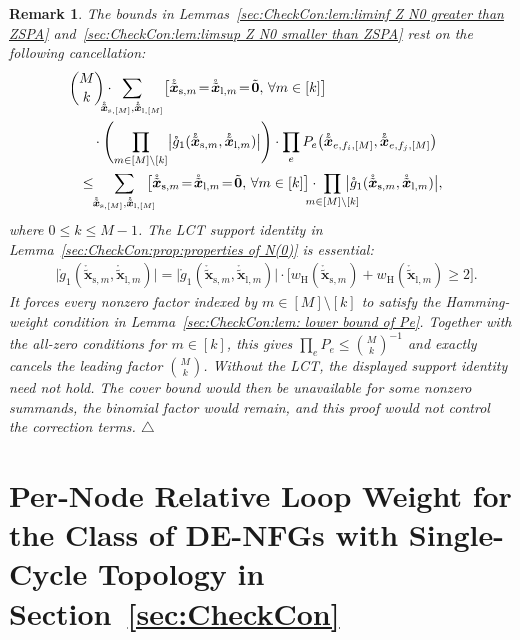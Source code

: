 \documentclass[journal]{IEEEtran}
\newcommand{\add}[1]{{\color{black}#1}}
\newtheorem{remark}[theorem]{Remark}
\newcommand{\manualendsymbol}[1]{%
  \leavevmode\unskip\penalty9999\hbox{}\nobreak\hfill
  \quad\hbox{#1}}
\newcommand{\eremark}{\manualendsymbol{\ensuremath{\triangle}}}
\newcommand{\vect}[1]{ \bm{#1} }
\newcommand{\wh}{w_{\mathrm{H}}}
\newcommand{\LCTtv}[1]{ \mathring{ \tilde{ \vect{#1} } } }
\newcommand{\LCT}[1]{ \mathring{#1} }
\newcommand{\efi}{ e,f_i }
\newcommand{\efj}{ e,f_j }
\newcommand{\LCTvxlm}{ \LCTtv{x}_{\mathrm{l},m} }
\newcommand{\LCTvxsm}{ \LCTtv{x}_{\mathrm{s},m} }
\newcommand{\LCTvxlM}{ \LCTtv{x}_{\mathrm{l},[M]} }
\newcommand{\LCTvxsM}{ \LCTtv{x}_{\mathrm{s},[M]} }
\newcommand{\gone}{\LCT{g}_{1}}
\newcommand{\tv}[1]{ \tilde{\vect{#1}} }
\begin{document}
\begin{appendices}
  \begin{remark}
    \add{The bounds in Lemmas~\ref{sec:CheckCon:lem:liminf Z N0 greater than
        ZSPA} and~\ref{sec:CheckCon:lem:limsup Z N0 smaller than ZSPA} rest on
      the following cancellation:}
    \begin{align*}
       & \hspace{-0.25 cm}
      \binom{M}{k}
      \cdot \!\! \!\! \!\!
      \sum_{ \LCTvxsM, \LCTvxlM }
      \bigl[ \LCTvxsm \! = \! \LCTvxlm \! = \! \tv{0},\, \forall m \in [k] \bigr]
      \\
       & \quad\cdot
      \Biggl(
      \prod_{ m \in [M] \setminus [k] }
      \bigl|\gone( \LCTvxsm, \LCTvxlm )\bigr|
      \Biggr)
      \cdot \prod_{e}
      P_{e}\bigl( \LCTtv{x}_{\efi,[M]}, \LCTtv{x}_{\efj,[M]} \bigr)
      \\
       & \leq
      \!\!\sum_{ \LCTvxsM, \LCTvxlM }
      \!\!\!\!\bigl[ \LCTvxsm \! = \! \LCTvxlm \! = \! \tv{0},\, \forall m \in [k] \bigr]
      \cdot\!\!\!\!\!\!
      \prod_{ m \in [M] \setminus [k] }
      \!\!\!\!\!\!\bigl|\gone( \LCTvxsm, \LCTvxlm )\bigr|,
    \end{align*}
    \add{where $0 \leq k \leq M-1$.}  \add{The LCT support identity in
      Lemma~\ref{sec:CheckCon:prop:properties of N(0)} is essential:}
    \begin{align*}
       & \bigl|\gone( \LCTvxsm, \LCTvxlm )\bigr| = \bigl|\gone( \LCTvxsm, \LCTvxlm )\bigr| \!\cdot\!
      \bigl[ \wh(\LCTvxsm) \! + \! \wh( \LCTvxlm) \! \geq \! 2 \bigr].
    \end{align*}
    \add{It forces every nonzero factor indexed by $m \in [M] \setminus [k]$ to satisfy the Hamming-weight condition in Lemma~\ref{sec:CheckCon:lem: lower bound of Pe}. Together with the all-zero conditions for $m \in [k]$, this gives
      $\prod_e P_e\leq\binom{M}{k}^{-1}$ and exactly cancels the leading factor $\binom{M}{k}$. Without the LCT, the displayed support identity need not hold. The cover bound would then be unavailable for some nonzero summands, the binomial factor would remain, and this proof would not control the correction terms.}
    \eremark
  \end{remark}

  \add{\section{Per-Node Relative Loop Weight for the Class of DE-NFGs with Single-Cycle Topology in Section~\ref{sec:CheckCon}}
    \label{apx:single-cycle-loop-weight}

}
\end{appendices}
\end{document}
